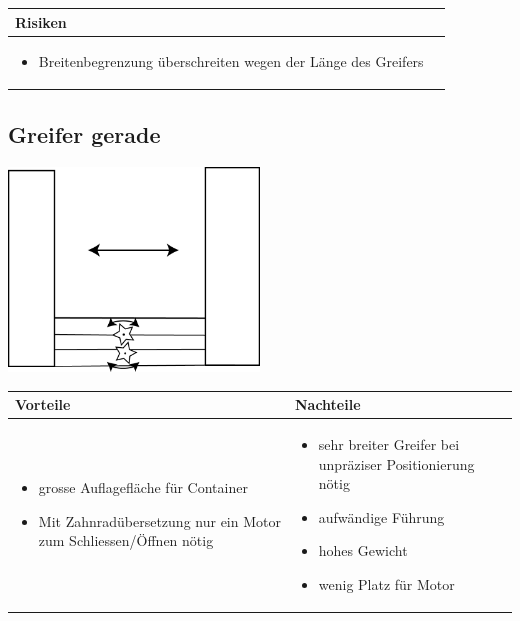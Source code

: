 \begin{table}[h]
\begin{tabular}{p{}p{}}


 \textbf{Risiken} & \\ \hline
	 
\begin{itemize}
\item Breitenbegrenzung überschreiten wegen der Länge des Greifers
\end{itemize}

 
\end{tabular}
\end{table}

\pagebreak


\subsection{Greifer gerade}

\includegraphics[width=0.5\textwidth]{fig/Greifer_gerade.png}

\begin{table}[h]
\begin{tabular}{p{} | p{}}


 \textbf{Vorteile} & \textbf{Nachteile} \\ \hline
	 
\begin{itemize}
\item grosse Auflagefläche für Container
\item Mit Zahnradübersetzung nur ein Motor zum Schliessen/Öffnen nötig
\end{itemize}

 
 &
 
\begin{itemize}
\item sehr breiter Greifer bei unpräziser Positionierung nötig
\item aufwändige Führung
\item hohes Gewicht
\item wenig Platz für Motor
\end{itemize}

\end{tabular}
\end{table}

